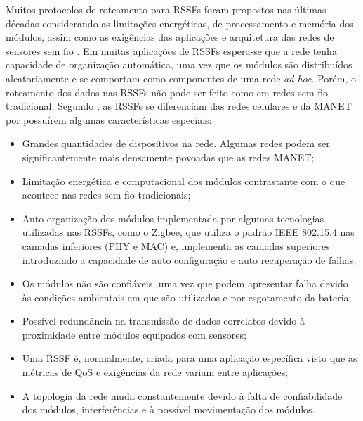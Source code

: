 Muitos protocolos de roteamento para \ac{RSSF}s foram propostos nas últimas décadas considerando as limitações energéticas, de processamento e memória dos módulos, assim como as exigências das aplicações e arquitetura das redes de sensores sem fio \cite{Alazzawi}. Em muitas aplicações de \ac{RSSF}s espera-se que a rede tenha capacidade de organização automática, uma vez que os módulos são distribuídos aleatoriamente e se comportam como componentes de uma rede \textit{ad hoc}. Porém, o roteamento dos dados nas \ac{RSSF}s não pode ser feito como em redes sem fio tradicional. Segundo , as \ac{RSSF}s se diferenciam das redes celulares e da \ac{MANET} por possuírem algumas características especiais:

\begin{itemize}
  \item Grandes quantidades de dispositivos na rede. Algumas redes podem ser significantemente mais densamente povoadas que as redes \ac{MANET};
  \item Limitação energética e computacional dos módulos contrastante com o que acontece nas redes sem fio tradicionais;
  \item Auto-organização dos módulos implementada por algumas tecnologias utilizadas nas \ac{RSSF}s, como o Zigbee, que utiliza o padrão IEEE 802.15.4 nas camadas inferiores (\ac{PHY} e \ac{MAC}) e, implementa as camadas superiores introduzindo a capacidade de auto configuração e auto recuperação de falhas;
  \item Os módulos não são confiáveis, uma vez que podem apresentar falha devido às condições ambientais em que são utilizados e por esgotamento da bateria;
  \item Possível redundância na transmissão de dados correlatos devido à proximidade entre módulos equipados com sensores;
  \item Uma \ac{RSSF} é, normalmente, criada para uma aplicação específica visto que as métricas de \ac{QoS} e exigências da rede variam entre aplicações;
  \item A topologia da rede muda constantemente devido à falta de confiabilidade dos módulos, interferências e à possível movimentação dos módulos.
\end{itemize}


